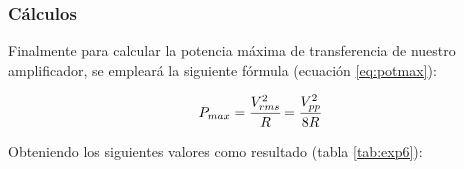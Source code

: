 \subsubsection{Cálculos}

Finalmente para calcular la potencia máxima de transferencia de nuestro amplificador, se empleará la siguiente fórmula (ecuación \ref{eq:potmax}):

\begin{equation}
    P_{max} = \cfrac{V_{rms}^2}{R} = \cfrac{V_{pp}^2}{8R}
    \label{eq:potmax}
\end{equation}

Obteniendo los siguientes valores como resultado (tabla \ref{tab:exp6}):

\begin{table}[H]
    \centering
        \def\tablename{Tabla} 
        \caption{Potencias calculadas}
        \label{tab:exp6}
\end{table}

